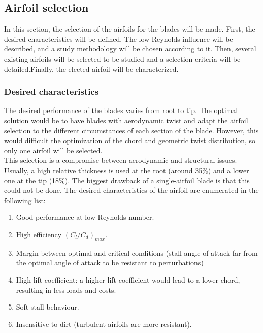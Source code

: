 \documentclass[../TFG_Report.tex]{subfiles}
\begin{document}
\subsection{Airfoil selection}

In this section, the selection of the airfoils for the blades will be made. First, the desired characteristics will be defined. The low Reynolds influence will be described, and a study methodology will be chosen according to it. Then, several existing airfoils will be selected to be studied and a selection criteria will be detailed.Finally, the elected airfoil will be characterized. 


\subsubsection*{Desired characteristics}

The desired performance of the blades varies from root to tip. The optimal solution would be to have blades with aerodynamic twist and adapt the airfoil selection to the different circumstances of each section of the blade. However, this would difficult the optimization of the chord and geometric twist distribution, so only one airfoil will be selected. \\

This selection is a compromise between aerodynamic and structural issues. Usually, a high relative thickness is used at the root (around 35\%) and a lower one at the tip (18\%). The biggest drawback of a single-airfoil blade is that this could not be done. The desired characteristics of the airfoil are enumerated in the following list: \cite{Apunts} \cite{Wood}


\begin{enumerate}
	\item Good performance at low Reynolds number. 
	\item High efficiency $(C_l/C_d)_{max}$.
	\item Margin between optimal and critical conditions (stall angle of attack far from the optimal angle of attack to be resistant to perturbations)
	\item High lift coefficient: a higher lift coefficient would lead to a lower chord, resulting in less loads and costs.  
	\item Soft stall behaviour.
	\item Insensitive to dirt (turbulent airfoils are more resistant). 
\end{enumerate}
\end{document}
